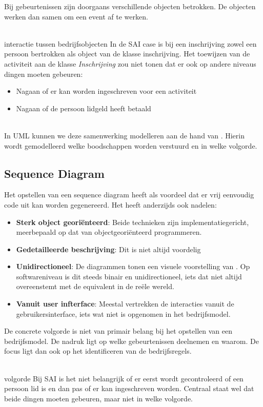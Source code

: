 \documentclass[../../main.tex]{subfiles}
\begin{document}
Bij gebeurtenissen zijn doorgaans verschillende objecten betrokken. De objecten werken dan samen om een event af te werken.\\
\\
\begin{ex}{interactie tussen bedrijfsobjecten}
In de SAI case is bij een inschrijving zowel een persoon bertrokken als object van de klasse inschrijving. Het toewijzen van de activiteit aan de klasse \textit{Inschrijving} zou niet tonen dat er ook op andere niveaus dingen moeten gebeuren:
\begin{itemize}
	\item Nagaan of er kan worden ingeschreven voor een activiteit
	\item Nagaan of de persoon lidgeld heeft betaald
\end{itemize}
\end{ex}
\\
In UML kunnen we deze samenwerking modelleren aan de hand van . Hierin wordt gemodelleerd welke boodschappen worden verstuurd en in welke volgorde.

\subsection{Sequence Diagram}
Het opstellen van een sequence diagram heeft als voordeel dat er vrij eenvoudig code uit kan worden gegenereerd. Het heeft anderzijds ook nadelen:
\begin{itemize}
	\item \textbf{Sterk object geori\"enteerd}: Beide technieken zijn implementatiegericht, meerbepaald op dat van objectgeori\"enteerd programmeren.
	\item \textbf{Gedetailleerde beschrijving}: Dit is niet altijd voordelig
	\item \textbf{Unidirectioneel}: De diagrammen tonen een visuele voorstelling van . Op softwareniveau is dit steeds binair en unidirectioneel, iets dat niet altijd overeenstemt met de equivalent in de re\"ele wereld.
	\item \textbf{Vanuit user infterface}: Meestal vertrekken de interacties vanuit de gebruikersinterface, iets wat niet is opgenomen in het bedrijfsmodel.
\end{itemize}
De concrete volgorde is niet van primair belang bij het opstellen van een bedrijfsmodel. De nadruk ligt op welke gebeurtenissen deelnemen en waarom. De focus ligt dan ook op het identificeren van de bedrijfsregels.\\
\\
\begin{ex}{volgorde}
Bij SAI is het niet belangrijk of er eerst wordt gecontroleerd of een persoon lid is en dan pas of er kan ingeschreven worden. Centraal staat wel dat beide dingen moeten gebeuren, maar niet in welke volgorde.
\end{ex}
\end{document}
